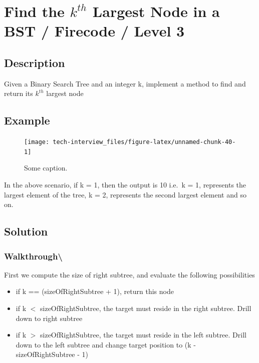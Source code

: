 \documentclass[]{book}
\providecommand{\tightlist}{%
  \setlength{\itemsep}{0pt}\setlength{\parskip}{0pt}}
\begin{document}
\section{Find the $k^{th}$ Largest Node in a BST / Firecode / Level 3}

\hypertarget{description-76}{%
\subsection{Description}\label{description-76}}

Given a Binary Search Tree and an integer k, implement a method to find and return its \(k^{th}\) largest node

\hypertarget{example-73}{%
\subsection{Example}\label{example-73}}

\begin{figure}
\texttt{[image: tech-interview\_files/figure-latex/unnamed-chunk-40-1]} \caption{Some caption.}\label{fig:unnamed-chunk-40}
\end{figure}

In the above scenario, if k = 1, then the output is 10 i.e.~k = 1, represents the largest element of the tree,
k = 2, represents the second largest element and so on.

\hypertarget{solution-53}{%
\subsection{Solution}\label{solution-53}}

\hypertarget{walkthrough-87}{%
\subsubsection{Walkthrough\textbackslash{}}\label{walkthrough-87}}

First we compute the size of right subtree, and evaluate the following possibilities

\begin{itemize}
\tightlist
\item
  if k == (sizeOfRightSubtree + 1), return this node
\item
  if k \(<\) sizeOfRightSubtree, the target must reside in the right subtree. Drill down to right subtree
\item
  if k \(>\) sizeOfRightSubtree, the target must reside in the left subtree. Drill down to the left subtree and
  change target position to (k - sizeOfRightSubtree - 1)
\end{itemize}
\end{document}
